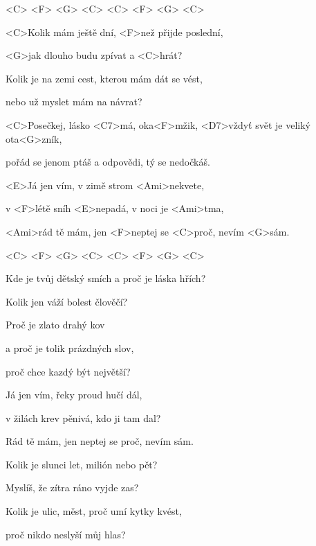 


<C> <F> <G> <C> <C> <F> <G> <C>

\zs
<C>Kolik mám ještě {dní}, <F>než přijde poslední,

<G>jak dlouho budu zpívat a <C>hrát?

Kolik je na zemi cest, kterou mám dát se vést,

nebo už myslet mám na návrat?
\ks

\zr
<C>Posečkej, lásko <C7>má, oka<F>mžik,
<D7>vždyť svět je veliký ota<G>zník,

pořád se jenom ptáš a odpovědi, tý se nedočkáš.
\kr

\zr
<E>Já jen vím, v zimě strom <Ami>nekvete,

v <F>létě sníh <E>nepadá, v noci je <Ami>tma,

<Ami>rád tě mám,
jen <F>neptej se <C>proč, nevím <G>sám.
\kr

<C> <F> <G> <C> <C> <F> <G> <C>

\zs
Kde je tvůj dětský smích a proč je láska hřích?

Kolik jen váží bolest člověčí?

Proč je zlato drahý kov

a proč je tolik prázdných slov,

proč chce kazdý být největší?
\ks

\zr \kr

\zr
Já jen vím, řeky proud hučí dál,

v žilách krev pěnivá, kdo ji tam dal?

Rád tě mám, jen neptej se proč, nevím sám.
\kr

\zs
Kolik je slunci let, milión nebo pět?

Myslíš, že zítra ráno vyjde zas?

Kolik je ulic, měst, proč umí kytky kvést,

proč nikdo neslyší můj hlas?
\ks

\kp





